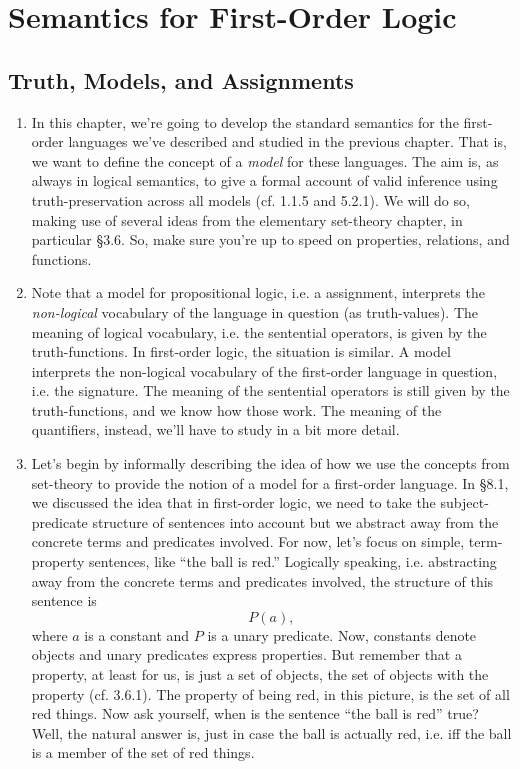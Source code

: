 \chapter{Semantics for First-Order Logic}

\section{Truth, Models, and Assignments}

	\begin{enumerate}[\thesection.1]

		\item In this chapter, we're going to develop the standard semantics for the first-order languages we've described and studied in the previous chapter. That is, we want to define the concept of a \emph{model} for these languages. The aim is, as always in logical semantics, to give a formal account of valid inference using truth-preservation across all models (cf. 1.1.5 and 5.2.1). We will do so, making use of several ideas from the elementary set-theory chapter, in particular \S3.6. So, make sure you're up to speed on properties, relations, and functions.
		
		\item Note that a model for propositional logic, i.e. a assignment, interprets the \emph{non-logical} vocabulary of the language in question (as truth-values). The meaning of logical vocabulary, i.e. the sentential operators, is given by the truth-functions. In first-order logic, the situation is similar. A model interprets the non-logical vocabulary of the first-order language in question, i.e. the signature. The meaning of the sentential operators is still given by the truth-functions, and we know how those work. The meaning of the quantifiers, instead, we'll have to study in a bit more detail. 
		
		\item Let's begin by informally describing the idea of how we use the concepts from set-theory to provide the notion of a model for a first-order language. In \S8.1, we discussed the idea that in first-order logic, we need to take the subject-predicate structure of sentences into account but we abstract away from the concrete terms and predicates involved. For now, let's focus on simple, term-property sentences, like ``the ball is red.'' Logically speaking, i.e. abstracting away from the concrete terms and predicates involved, the structure of this sentence is \[P(a),\] where $a$ is a constant and $P$ is a unary predicate. Now, constants denote objects and unary predicates express properties. But remember that a property, at least for us, is just a set of objects, the set of objects with the property (cf. 3.6.1). The property of being red, in this picture, is the set of all red things. Now ask yourself, when is the sentence ``the ball is red'' true? Well, the natural answer is, just in case the ball is actually red, i.e. iff the ball is a member of the set of red things. 
		

\end{enumerate}
